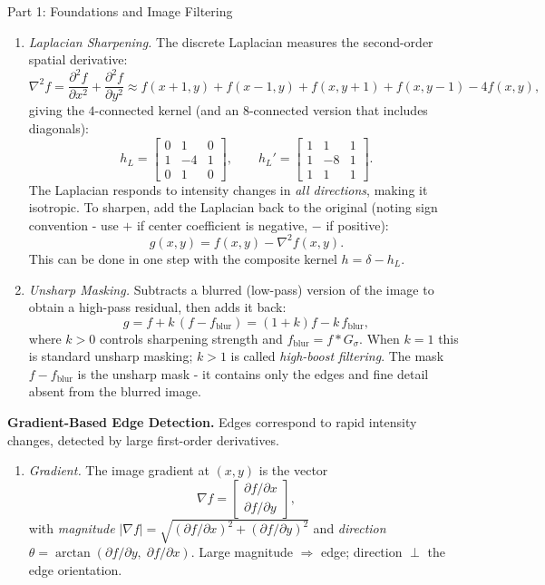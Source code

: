 \documentclass[letterpaper]{article}
\begin{document}
\begin{notes}{Part 1: Foundations and Image Filtering}
\begin{enumerate}
    \item \textit{Laplacian Sharpening.} The discrete Laplacian measures the second-order spatial derivative:
    $$\nabla^2 f = \frac{\partial^2 f}{\partial x^2} + \frac{\partial^2 f}{\partial y^2} \approx f(x+1,y)+f(x-1,y)+f(x,y+1)+f(x,y-1)-4f(x,y),$$
    giving the $4$-connected kernel (and an $8$-connected version that includes diagonals):
    $$h_L = \begin{bmatrix}0&1&0\\1&-4&1\\0&1&0\end{bmatrix}, \qquad h_L' = \begin{bmatrix}1&1&1\\1&-8&1\\1&1&1\end{bmatrix}.$$
    The Laplacian responds to intensity changes in \emph{all directions}, making it isotropic. To sharpen, add the Laplacian back to the original (noting sign convention - use $+$ if center coefficient is negative, $-$ if positive):
    $$g(x,y) = f(x,y) - \nabla^2 f(x,y).$$
    This can be done in one step with the composite kernel $h = \delta - h_L$.
    
    \item \textit{Unsharp Masking.} Subtracts a blurred (low-pass) version of the image to obtain a high-pass residual, then adds it back:
    $$g = f + k\,(f - f_{\text{blur}}) = (1+k)f - k\,f_{\text{blur}},$$
    where $k>0$ controls sharpening strength and $f_{\text{blur}} = f * G_\sigma$. When $k=1$ this is standard unsharp masking; $k>1$ is called \emph{high-boost filtering}. The mask $f - f_{\text{blur}}$ is the unsharp mask - it contains only the edges and fine detail absent from the blurred image.
\end{enumerate}



\textbf{Gradient-Based Edge Detection.} Edges correspond to rapid intensity changes, detected by large first-order derivatives.

\begin{enumerate}
    \item \textit{Gradient.} The image gradient at $(x,y)$ is the vector
    $$\nabla f = \begin{bmatrix}\partial f/\partial x \\ \partial f/\partial y\end{bmatrix},$$
    with \emph{magnitude} $|\nabla f| = \sqrt{(\partial f/\partial x)^2 + (\partial f/\partial y)^2}$ and \emph{direction} $\theta = \arctan(\partial f/\partial y,\; \partial f/\partial x)$. Large magnitude $\Rightarrow$ edge; direction $\perp$ the edge orientation.
    

\end{enumerate}
\end{notes}
\end{document}
